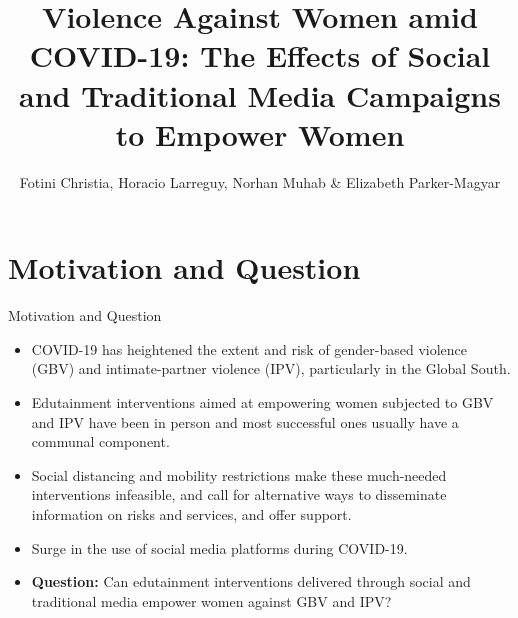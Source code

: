 \documentclass[10pt]{beamer}
\title[Violence amid COVID-19]{Violence Against Women amid COVID-19: The Effects of Social and Traditional Media Campaigns to Empower
Women}
\author[Horacio Larreguy]{Fotini Christia, Horacio Larreguy, Norhan Muhab \& Elizabeth Parker-Magyar}
\institute[IAST]{Institute For Advanced Study in Toulouse}
\begin{document}


\begin{frame}{}
    \titlepage
\end{frame}

\section{Motivation and Question}
\begin{frame}{Motivation and Question}

\begin{center}
    \begin{itemize}
        \item COVID-19 has heightened the extent and risk of gender-based violence (GBV) and intimate-partner violence (IPV), particularly in the Global South.
        \vspace{5pt}
        \item Edutainment interventions aimed at empowering women subjected to GBV and IPV have been in person and most successful ones usually have a communal component.
        \vspace{5pt}        
        \item Social distancing and mobility restrictions make these much-needed interventions infeasible, and call for alternative ways to disseminate information on risks and services, and offer support.
        \vspace{5pt}        
        \item Surge in the use of social media platforms during COVID-19. 
        \vspace{5pt}        
        \item  \textbf{Question:} Can edutainment interventions delivered through social and traditional media empower women against GBV and IPV?
    \end{itemize}

\end{center}
    
\end{frame}
\end{document}

